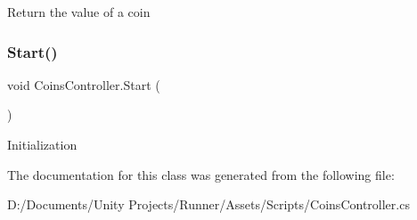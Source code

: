 Return the value of a coin \mbox{\label{class_coins_controller_a66e8e82f7c8252eb269ac33c14f64ff4}} 
\subsubsection{\texorpdfstring{Start()}{Start()}}
{\footnotesize\ttfamily void Coins\+Controller.\+Start (\begin{DoxyParamCaption}{ }\end{DoxyParamCaption})\hspace{0.3cm}{\ttfamily [private]}}

Initialization 

The documentation for this class was generated from the following file\+:\begin{DoxyCompactItemize}
\item 
D\+:/\+Documents/\+Unity Projects/\+Runner/\+Assets/\+Scripts/Coins\+Controller.\+cs\end{DoxyCompactItemize}
